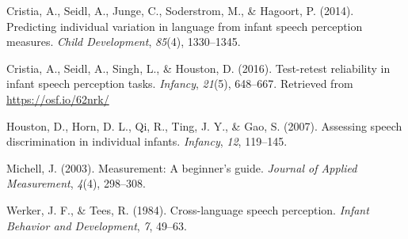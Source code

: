 \documentclass[man]{apa6}
\begin{document}
\setlength{\parindent}{-0.5in} \setlength{\leftskip}{0.5in}

\hypertarget{refs}{}
\hypertarget{ref-cristia2014predicting}{}
Cristia, A., Seidl, A., Junge, C., Soderstrom, M., \& Hagoort, P.
(2014). Predicting individual variation in language from infant speech
perception measures. \emph{Child Development}, \emph{85}(4), 1330--1345.

\hypertarget{ref-cristia2016test}{}
Cristia, A., Seidl, A., Singh, L., \& Houston, D. (2016). Test-retest
reliability in infant speech perception tasks. \emph{Infancy},
\emph{21}(5), 648--667. Retrieved from \url{https://osf.io/62nrk/}

\hypertarget{ref-houston2007assessing}{}
Houston, D., Horn, D. L., Qi, R., Ting, J. Y., \& Gao, S. (2007).
Assessing speech discrimination in individual infants. \emph{Infancy},
\emph{12}, 119--145.

\hypertarget{ref-michell2003measurement}{}
Michell, J. (2003). Measurement: A beginner's guide. \emph{Journal of
Applied Measurement}, \emph{4}(4), 298--308.

\hypertarget{ref-werker1984cross}{}
Werker, J. F., \& Tees, R. (1984). Cross-language speech perception.
\emph{Infant Behavior and Development}, \emph{7}, 49--63.
\end{document}
